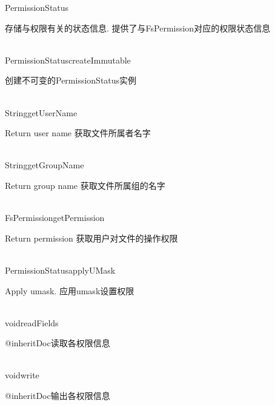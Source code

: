 \begin{XeClass}{PermissionStatus}
   
 存储与权限有关的状态信息.
 提供了与FsPermission对应的权限状态信息

  \begin{XeMethod}{\XePublic\\ }{PermissionStatus}{createImmutable}
       
 创建不可变的PermissionStatus实例 

  \end{XeMethod}

  \begin{XeMethod}{\XePublic\\ }{String}{getUserName}
       
 Return user name
 获取文件所属者名字

  \end{XeMethod}

  \begin{XeMethod}{\XePublic\\ }{String}{getGroupName}
       
 Return group name
 获取文件所属组的名字

  \end{XeMethod}

  \begin{XeMethod}{\XePublic\\ }{FsPermission}{getPermission}
       
 Return permission
 获取用户对文件的操作权限

  \end{XeMethod}

  \begin{XeMethod}{\XePublic\\ }{PermissionStatus}{applyUMask}
       
 Apply umask.
 应用umask设置权限

  \end{XeMethod}

  \begin{XeMethod}{\XePublic\\ }{void}{readFields}
       
 {@inheritDoc}读取各权限信息

  \end{XeMethod}

  \begin{XeMethod}{\XePublic\\ }{void}{write}
       
 {@inheritDoc}输出各权限信息

  \end{XeMethod}

\end{XeClass}
